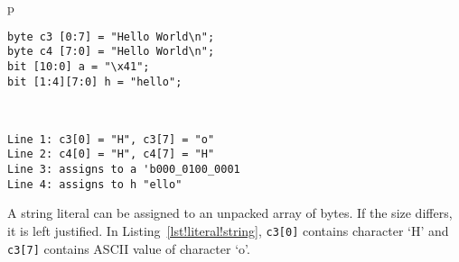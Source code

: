 \begin{table}
\begin{tabular}{p\textwidth}
\begin{lstlisting}[label=lst!literal!string, caption=String Literal
    Examples]
byte c3 [0:7] = "Hello World\n";
byte c4 [7:0] = "Hello World\n";
bit [10:0] a = "\x41";
bit [1:4][7:0] h = "hello";
\end{lstlisting}
\\
\begin{tbldesc}
\begin{verbatim}
Line 1: c3[0] = "H", c3[7] = "o"
Line 2: c4[0] = "H", c4[7] = "H"
Line 3: assigns to a 'b000_0100_0001
Line 4: assigns to h "ello"
\end{verbatim}
\end{tbldesc}
\end{tabular}
\end{table}

A string literal can be assigned to an unpacked array of bytes. If the
size differs, it is left justified. In
Listing~\ref{lst!literal!string}, \texttt{c3[0]} contains character
`H' and \texttt{c3[7]} contains ASCII value of character `o'.
